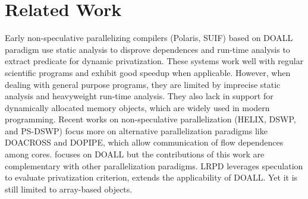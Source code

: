 \section{Related Work}






Early non-speculative parallelizing compilers (Polaris, SUIF) based on
DOALL paradigm use static analysis to disprove dependences and run-time
analysis to extract predicate for dynamic privatization. These systems work
well with regular scientific programs and exhibit good speedup when
applicable. However, when dealing with general purpose programs, they are
limited by imprecise static analysis and heavyweight run-time analysis.
They also lack in support for dynamically allocated memory objects, which
are widely used in modern programming. Recent works on non-speculative
parallelization (HELIX, DSWP, and PS-DSWP) focus more on alternative
parallelization paradigms like DOACROSS and DOPIPE, which allow
communication of flow dependences among cores. \name focuses on DOALL but
the contributions of this work are complementary with other parallelization
paradigms. LRPD leverages speculation to evaluate privatization criterion,
extends the applicability of DOALL. Yet it is still limited to array-based
objects.

